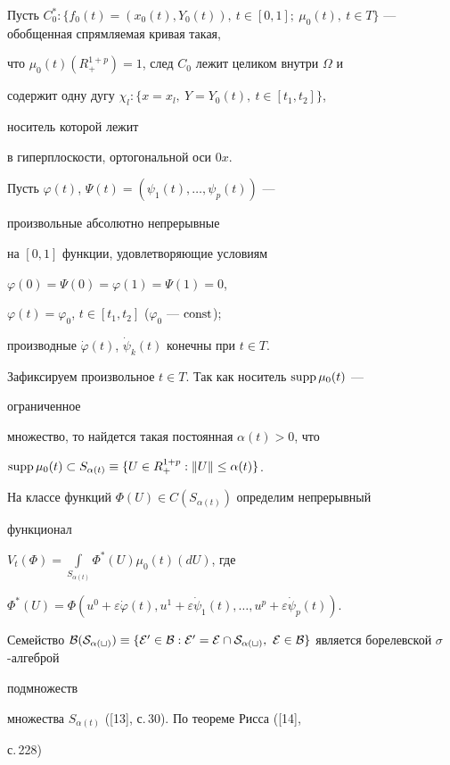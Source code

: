  


Пусть $C^*_0:\{f_0(t)=(x_0(t),Y_0(t)),\ t\in[0,1];\ \mu_0(t),\ t\in 


T\}$ --- обобщенная спрямляемая кривая такая, 


что $\mu_0(t)(R^{1+p}_+)=1$, след $C_0$ лежит целиком внутри $\Omega$ и 


содержит одну дугу $\chi_l:\{x=x_l,\ Y=Y_0(t),\ t\in[t_1,t_2]\}$, 


носитель которой лежит 


в гиперплоскости, ортогональной оси $0x$. 


Пусть $\varphi(t)$, $\Psi(t)=(\psi_1(t),\dotsc,\psi_p(t))$ --- 


произвольные абсолютно непрерывные 


на $[0,1]$ функции, удовлетворяющие условиям 


$\varphi(0)=\Psi(0)=\varphi(1)=\Psi(1)=0$, 


$\varphi(t)=\varphi_0$, $t\in[t_1,t_2]$ ($\varphi_0$ --- $\operatorname{const}$); 


производные $\Dot\varphi(t)$, $\Dot\psi_k(t)$ конечны при $t\in T$. 


 


Зафиксируем произвольное $t\in T$. Так как носитель $\operatorname{supp}\mu_0(t)$ --- 


ограниченное 


множество, то найдется такая постоянная $\alpha(t)>0$, что 


$\supp\mu_0(t)\subset S_{\alpha(t)}\equiv\{U\in 


R^{1+p}_+:\|U\|\le\alpha(t)\}$. 


На классе функций $\Phi(U)\in C(S_{\alpha(t)})$ определим непрерывный 


функционал 


$V_t(\Phi)=\int\limits_{S_{\alpha(t)}}\Phi^*(U)\mu_0(t)(d{}U)$, где 


$\Phi^*(U)=\Phi(u^0+\varepsilon\Dot\varphi(t), 


u^1+\varepsilon\Dot\psi_1(t),\dotsc,u^p+ \varepsilon\Dot\psi_p(t))$. 


Семейство $\cal B(S_{\alpha(t)})\equiv\{E'\in\cal B:E'=E\cap 


S_{\alpha(t)},\ E\in\cal B\}$ является борелевской $\sigma$-алгеброй 


подмножеств 


множества $S_{\alpha(t)}$ ([13], с.\,30). По теореме Рисса ([14], 


с.\,228) 


